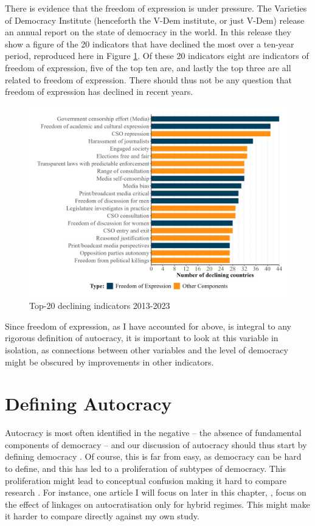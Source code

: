 There is evidence that the freedom of expression is under pressure. The Varieties of Democracy Institute (henceforth the V-Dem institute, or just V-Dem) release an annual report on the state of democracy in the world. In this release they show a figure of the 20 indicators that have declined the most over a ten-year period, reproduced here in Figure \ref{fig:declining}. Of these 20 indicators eight are indicators of freedom of expression, five of the top ten are, and lastly the top three are all related to freedom of expression. There should thus not be any question that freedom of expression has declined in recent years.

\begin{figure}[hbt!]
    \centering
    \includegraphics[width=\linewidth]{graphics/declining_indicators.jpeg}
    \caption{Top-20 declining indicators 2013-2023 \citep[p. 17]{nord_democracy_2025}}
    \label{fig:declining}
\end{figure}

Since freedom of expression, as I have accounted for above, is integral to any rigorous definition of autocracy, it is important to look at this variable in isolation, as connections between other variables and the level of democracy might be obscured by improvements in other indicators.

\section{Defining Autocracy}
Autocracy is most often identified in the negative -- the absence of fundamental components of democracy -- and our discussion of autocracy should thus start by defining democracy \citep{dahl_polyarchy_1971, przeworski_democracy_1991, schumpeter_capitalism_2010}. Of course, this is far from easy, as democracy can be hard to define, and this has led to a proliferation of subtypes of democracy. This proliferation might lead to conceptual confusion making it hard to compare research \citep{collier_democracy_1997}. For instance, one article I will focus on later in this chapter, \citet{tansey_ties_2017}, focus on the effect of linkages on autocratisation only for hybrid regimes. This might make it harder to compare directly against my own study. 

